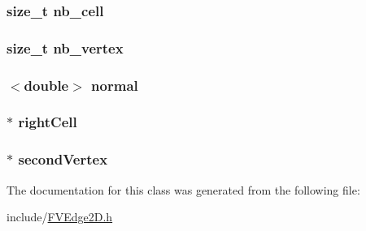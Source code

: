 \label{db/d31/classFVEdge2D_a928b11f5716331f0b89abe7d8d4124b4}
\hypertarget{classFVEdge2D_a1a5a11cfc8bbaa0cf132759c0382da70}{
\subsubsection[{nb\_\-cell}]{\setlength{\rightskip}{0pt plus 5cm}size\_\-t {\bf nb\_\-cell}}}
\label{db/d31/classFVEdge2D_a1a5a11cfc8bbaa0cf132759c0382da70}
\hypertarget{classFVEdge2D_a0a063e99fbc85e837d93dfbcda6f5252}{
\subsubsection[{nb\_\-vertex}]{\setlength{\rightskip}{0pt plus 5cm}size\_\-t {\bf nb\_\-vertex}}}
\label{db/d31/classFVEdge2D_a0a063e99fbc85e837d93dfbcda6f5252}
\hypertarget{classFVEdge2D_a5b771cf762f8097181201565a3e7b490}{
\subsubsection[{normal}]{$<$double$>$ {\bf normal}}}
\label{db/d31/classFVEdge2D_a5b771cf762f8097181201565a3e7b490}
\hypertarget{classFVEdge2D_a0b77cc6541648a710e72fc0a59cb318d}{
\subsubsection[{rightCell}]{ $\ast$ {\bf rightCell}}}
\label{db/d31/classFVEdge2D_a0b77cc6541648a710e72fc0a59cb318d}
\hypertarget{classFVEdge2D_ac6bb5fc1a5f4ae86b6d0b5d06d86dc05}{
\subsubsection[{secondVertex}]{ $\ast$ {\bf secondVertex}}}
\label{db/d31/classFVEdge2D_ac6bb5fc1a5f4ae86b6d0b5d06d86dc05}


The documentation for this class was generated from the following file:\begin{DoxyCompactItemize}
\item 
include/\hyperlink{FVEdge2D_8h}{FVEdge2D.h}\end{DoxyCompactItemize}

